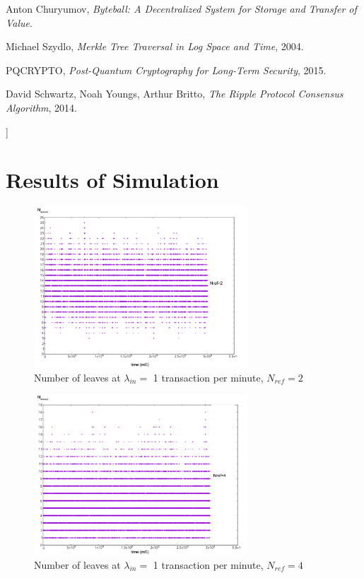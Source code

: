 \documentclass[a4paper,10pt,twocolumn]{article}
\begin{document}
\begin{@twocolumnfalse}
\begin{thebibliography}{99}
	Anton Churyumov,
		\emph{Byteball: A Decentralized System for Storage and 	Transfer of Value}.	

	Michael Szydlo,
		\emph{Merkle Tree Traversal in Log Space and Time}, 2004.	

		PQCRYPTO,
			\emph{Post-Quantum Cryptography for Long-Term Security}, 2015.	
	
	David Schwartz, Noah Youngs, Arthur Britto,
			\emph{The Ripple Protocol Consensus Algorithm}, 2014.	
	

	\end{thebibliography}
	
	\end{@twocolumnfalse}
	]


\clearpage

\appendix
\section{Results of Simulation}
\label{ap1}

\begin{figure}[ht]
	\begin{center}
	\includegraphics[width=80mm]{1min_2.png}
	  \caption{Number of leaves at \( \lambda_{in}=\) 1 transaction per minute, \( N_{ref}=2\)}
	\label{fig:min1_2}
	\end{center}
 \end{figure}

 \begin{figure}[ht]
	\begin{center}
		\includegraphics[width=80mm]{1min_4.png}
		\caption{Number of leaves at \( \lambda_{in}=\) 1 transaction per minute, \( N_{ref}=4\)}
	  \label{fig:min1_4}
	\end{center}
 \end{figure}
\end{document}
